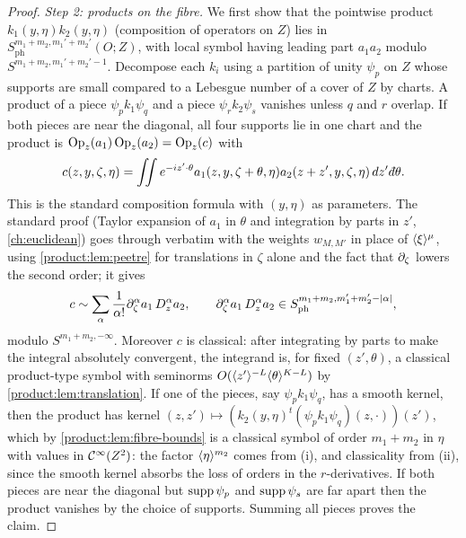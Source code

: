 \begin{proof}
\emph{Step 2: products on the fibre.} We first show that the pointwise product
$k_1(y,\eta)k_2(y,\eta)$ (composition of operators on $Z$) lies in
$S^{m_1+m_2,m_1'+m_2'}_{\mathrm{ph}}(O;Z)$, with local symbol having leading part
$a_1a_2$ modulo $S^{m_1+m_2,m_1'+m_2'-1}$. Decompose each $k_i$ using a partition
of unity $\psi_p$ on $Z$ whose supports are small compared to a Lebesgue number of
a cover of $Z$ by charts. A product of a piece $\psi_pk_1\psi_q$ and a piece
$\psi_rk_2\psi_s$ vanishes unless $q$ and $r$ overlap. If both pieces are near the
diagonal, all four supports lie in one chart and the product is
$\operatorname{Op}_z(a_1)\operatorname{Op}_z(a_2)=\operatorname{Op}_z(c)$ with
\begin{equation*}
c(z,y,\zeta,\eta)=\iint e^{-iz'\cdot\theta}a_1(z,y,\zeta+\theta,\eta)
a_2(z+z',y,\zeta,\eta)\,dz'\,\dbar\theta.
\end{equation*}
This is the standard composition formula with $(y,\eta)$ as parameters. The
standard proof (Taylor expansion of $a_1$ in $\theta$ and integration by parts in
$z'$, \cref{ch:euclidean}) goes through verbatim with the weights $w_{M,M'}$ in place of
$\langle \xi\rangle^\mu$, using \cref{product:lem:peetre} for translations in $\zeta$ alone and
the fact that $\partial_\zeta$ lowers the second order; it gives
\begin{equation*}
c\sim\sum_\alpha\frac1{\alpha!}\partial_\zeta^\alpha a_1\,D_z^\alpha a_2,\qquad
\partial_\zeta^\alpha a_1\,D_z^\alpha a_2\in S^{m_1+m_2,m_1'+m_2'-|\alpha|}_{\mathrm{ph}},
\end{equation*}
modulo $S^{m_1+m_2,-\infty}$. Moreover $c$ is classical: after integrating by parts
to make the integral absolutely convergent, the integrand is, for fixed
$(z',\theta)$, a classical product-type symbol with seminorms
$O(\langle z'\rangle^{-L}\langle \theta\rangle^{K-L})$ by \cref{product:lem:translation}. If one of the
pieces, say $\psi_pk_1\psi_q$, has a smooth kernel, then the product has kernel
$(z,z')\mapsto(k_2(y,\eta)^t(\psi_pk_1\psi_q)(z,\cdot))(z')$, which by
\cref{product:lem:fibre-bounds} is a classical symbol of order $m_1+m_2$ in $\eta$
with values in $\mathcal{C}^\infty(Z^2)$: the factor $\langle \eta\rangle^{m_2}$ comes from (i), and
classicality from (ii), since the smooth kernel absorbs the loss of orders in the
$r$-derivatives. If both pieces are near the diagonal but $\operatorname{supp}\psi_p$ and
$\operatorname{supp}\psi_s$ are far apart then the product vanishes by the choice of supports.
Summing all pieces proves the claim.


\end{proof}

